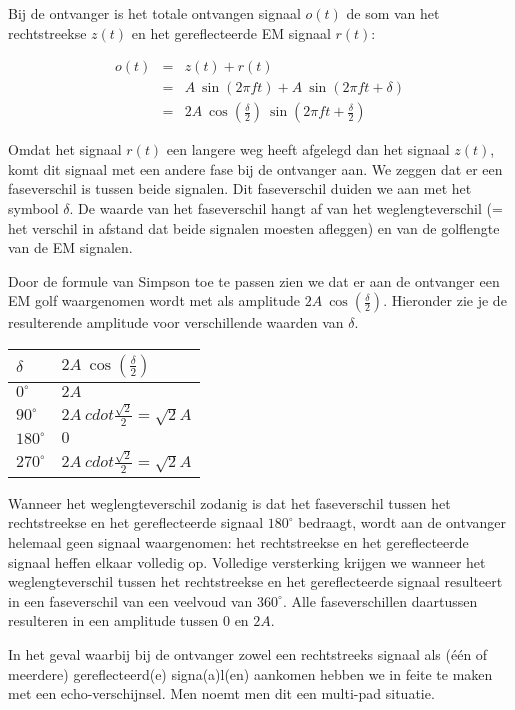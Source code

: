 Bij de ontvanger is het totale ontvangen signaal $o(t)$ de som van het rechtstreekse $z(t)$ en het gereflecteerde EM signaal $r(t)$:

\begin{eqnarray*}
o(t) &=& z(t) + r(t) \\
&=& A~\sin(2 \pi f t) + A~\sin(2 \pi f t + \delta) \\
&=& 2A ~ \cos(\frac{\delta}{2}) ~ \sin(2 \pi f t + \frac{\delta}{2}) 
\end{eqnarray*}

Omdat het signaal $r(t)$ een langere weg heeft afgelegd dan het signaal $z(t)$, komt dit signaal met een andere fase bij de ontvanger aan. We zeggen dat er een faseverschil is tussen beide signalen. Dit faseverschil duiden we aan met het symbool $\delta$. De waarde van het faseverschil hangt af van het weglengteverschil (= het verschil in afstand dat beide signalen moesten afleggen) en van de golflengte van de EM signalen.

Door de formule van Simpson toe te passen zien we dat er aan de ontvanger een EM golf waargenomen wordt met als amplitude $2A ~ \cos(\frac{\delta}{2})$. Hieronder zie je de resulterende amplitude voor verschillende waarden van $\delta$.

\begin{tabel}{}
\begin{tabular}[h]{l|l} 
$\delta$ & $2A ~ \cos(\frac{\delta}{2})$ \\
\hline
$0^{\circ}$ & $2A$ \\
$90^{\circ}$ & $2A \ cdot \frac{\sqrt{2}}{2} = \sqrt{2} A$ \\
$180^{\circ}$ & $0$ \\
$270^{\circ}$ & $2A \ cdot \frac{\sqrt{2}}{2} = \sqrt{2} A$\\
\end{tabular}
\end{tabel}

Wanneer het weglengteverschil zodanig is dat het faseverschil tussen het rechtstreekse en het gereflecteerde signaal $180^{\circ}$ bedraagt, wordt aan de ontvanger helemaal geen signaal waargenomen: het rechtstreekse en het gereflecteerde signaal heffen elkaar volledig op. Volledige versterking krijgen we wanneer het weglengteverschil tussen het rechtstreekse en het gereflecteerde signaal resulteert in een faseverschil van een veelvoud van $360^{\circ}$. Alle faseverschillen daartussen resulteren in een amplitude tussen $0$ en $2A$.

In het geval waarbij bij de ontvanger zowel een rechtstreeks signaal als (\'e\'en of meerdere) gereflecteerd(e) signa(a)l(en) aankomen hebben we in feite te maken met een echo-verschijnsel. Men noemt men dit een multi-pad situatie. 

